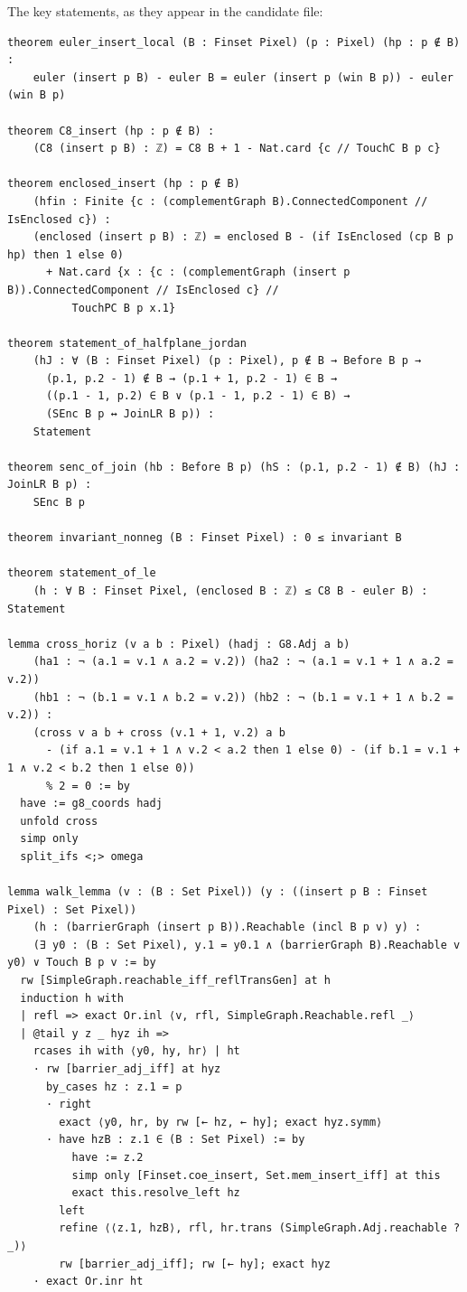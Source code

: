 \documentclass[11pt]{article}
\theoremstyle{definition}
\theoremstyle{remark}
\begin{document}
The key statements, as they appear in the candidate file:
\begin{lstlisting}
theorem euler_insert_local (B : Finset Pixel) (p : Pixel) (hp : p ∉ B) :
    euler (insert p B) - euler B = euler (insert p (win B p)) - euler (win B p)

theorem C8_insert (hp : p ∉ B) :
    (C8 (insert p B) : ℤ) = C8 B + 1 - Nat.card {c // TouchC B p c}

theorem enclosed_insert (hp : p ∉ B)
    (hfin : Finite {c : (complementGraph B).ConnectedComponent // IsEnclosed c}) :
    (enclosed (insert p B) : ℤ) = enclosed B - (if IsEnclosed (cp B p hp) then 1 else 0)
      + Nat.card {x : {c : (complementGraph (insert p B)).ConnectedComponent // IsEnclosed c} //
          TouchPC B p x.1}

theorem statement_of_halfplane_jordan
    (hJ : ∀ (B : Finset Pixel) (p : Pixel), p ∉ B → Before B p →
      (p.1, p.2 - 1) ∉ B → (p.1 + 1, p.2 - 1) ∈ B →
      ((p.1 - 1, p.2) ∈ B ∨ (p.1 - 1, p.2 - 1) ∈ B) →
      (SEnc B p ↔ JoinLR B p)) :
    Statement

theorem senc_of_join (hb : Before B p) (hS : (p.1, p.2 - 1) ∉ B) (hJ : JoinLR B p) :
    SEnc B p

theorem invariant_nonneg (B : Finset Pixel) : 0 ≤ invariant B

theorem statement_of_le
    (h : ∀ B : Finset Pixel, (enclosed B : ℤ) ≤ C8 B - euler B) : Statement

lemma cross_horiz (v a b : Pixel) (hadj : G8.Adj a b)
    (ha1 : ¬ (a.1 = v.1 ∧ a.2 = v.2)) (ha2 : ¬ (a.1 = v.1 + 1 ∧ a.2 = v.2))
    (hb1 : ¬ (b.1 = v.1 ∧ b.2 = v.2)) (hb2 : ¬ (b.1 = v.1 + 1 ∧ b.2 = v.2)) :
    (cross v a b + cross (v.1 + 1, v.2) a b
      - (if a.1 = v.1 + 1 ∧ v.2 < a.2 then 1 else 0) - (if b.1 = v.1 + 1 ∧ v.2 < b.2 then 1 else 0))
      % 2 = 0 := by
  have := g8_coords hadj
  unfold cross
  simp only
  split_ifs <;> omega

lemma walk_lemma (v : (B : Set Pixel)) (y : ((insert p B : Finset Pixel) : Set Pixel))
    (h : (barrierGraph (insert p B)).Reachable (incl B p v) y) :
    (∃ y0 : (B : Set Pixel), y.1 = y0.1 ∧ (barrierGraph B).Reachable v y0) ∨ Touch B p v := by
  rw [SimpleGraph.reachable_iff_reflTransGen] at h
  induction h with
  | refl => exact Or.inl ⟨v, rfl, SimpleGraph.Reachable.refl _⟩
  | @tail y z _ hyz ih =>
    rcases ih with ⟨y0, hy, hr⟩ | ht
    · rw [barrier_adj_iff] at hyz
      by_cases hz : z.1 = p
      · right
        exact ⟨y0, hr, by rw [← hz, ← hy]; exact hyz.symm⟩
      · have hzB : z.1 ∈ (B : Set Pixel) := by
          have := z.2
          simp only [Finset.coe_insert, Set.mem_insert_iff] at this
          exact this.resolve_left hz
        left
        refine ⟨⟨z.1, hzB⟩, rfl, hr.trans (SimpleGraph.Adj.reachable ?_)⟩
        rw [barrier_adj_iff]; rw [← hy]; exact hyz
    · exact Or.inr ht
\end{lstlisting}
\end{document}
